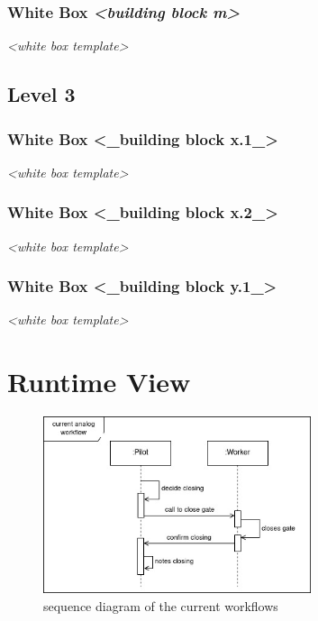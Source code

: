 \documentclass[
]{article}
\begin{document}
\hypertarget{_white_box_emphasis_building_block_m_emphasis}{%
\subsubsection{\texorpdfstring{White Box \emph{\textless building block
m\textgreater{}}}{White Box \textless building block m\textgreater{}}}\label{_white_box_emphasis_building_block_m_emphasis}}

\emph{\textless white box template\textgreater{}}

\hypertarget{_level_3}{%
\subsection{Level 3}\label{_level_3}}

\hypertarget{_white_box_building_block_x_1}{%
\subsubsection{White Box \textless\_building block
x.1\_\textgreater{}}\label{_white_box_building_block_x_1}}

\emph{\textless white box template\textgreater{}}

\hypertarget{_white_box_building_block_x_2}{%
\subsubsection{White Box \textless\_building block
x.2\_\textgreater{}}\label{_white_box_building_block_x_2}}

\emph{\textless white box template\textgreater{}}

\hypertarget{_white_box_building_block_y_1}{%
\subsubsection{White Box \textless\_building block
y.1\_\textgreater{}}\label{_white_box_building_block_y_1}}

\emph{\textless white box template\textgreater{}}

\hypertarget{section-runtime-view}{%
\section{Runtime View}\label{section-runtime-view}}

\begin{figure}[H]
  \centering
  \includegraphics[width=0.7\textwidth]{images/sequence_diagram-current.jpg}
  \caption{sequence diagram of the current workflows}
  \label{fig:seq_intro_curr}
\end{figure}
\end{document}
